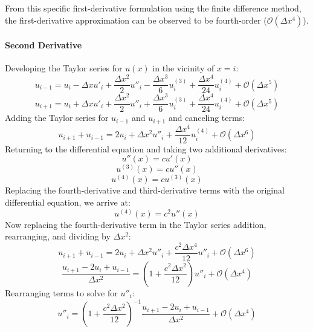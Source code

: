 \documentclass[10pt]{article}		%
\numberwithin{equation}{section}
\begin{document}
From this specific first-derivative formulation using the finite difference method, the first-derivative approximation can be observed to be fourth-order ($\mathcal{O}(\Delta x^4)$).

\paragraph{Second Derivative}
Developing the Taylor series for $u(x)$ in the vicinity of $x = i$:
\begin{equation}
u_{i-1} = u_i - \Delta x u'_i + \frac{\Delta x^2}{2} u''_i - \frac{\Delta x^3}{6} u^{(3)}_i + \frac{\Delta x^4}{24} u^{(4)}_i + \mathcal{O}(\Delta x^5)
\end{equation}
\begin{equation}
u_{i+1} = u_i + \Delta x u'_i + \frac{\Delta x^2}{2} u''_i + \frac{\Delta x^3}{6} u^{(3)}_i + \frac{\Delta x^4}{24} u^{(4)}_i + \mathcal{O}(\Delta x^5)
\end{equation}
Adding the Taylor series for $u_{i-1}$ and $u_{i+1}$ and canceling terms:
\begin{equation}
u_{i+1} + u_{i-1} = 2u_i + \Delta x^2 u''_i + \frac{\Delta x^4}{12} u^{(4)}_i + \mathcal{O}(\Delta x^6)
\end{equation}
Returning to the differential equation and taking two additional derivatives:
\begin{equation}
u''(x)=cu'(x)
\end{equation}
\begin{equation}
u^{(3)}(x)=cu''(x)
\end{equation}
\begin{equation}
u^{(4)}(x)=cu^{(3)}(x)
\end{equation}
Replacing the fourth-derivative and third-derivative terms with the original differential equation, we arrive at:
\begin{equation}
u^{(4)}(x) = c^2u''(x)
\end{equation}
Now replacing the fourth-derivative term in the Taylor series addition, rearranging, and dividing by $\Delta x^2$:
\begin{equation}
u_{i+1} + u_{i-1} = 2u_i + \Delta x^2 u''_i + \frac{c^2\Delta x^4}{12} u''_i + \mathcal{O}(\Delta x^6)
\end{equation}
\begin{equation}
\frac{u_{i+1} -2u_i + u_{i-1}}{\Delta x^2} =  \left(1 + \frac{c^2\Delta x^2}{12} \right)u''_i + \mathcal{O}(\Delta x^4)
\end{equation}
Rearranging terms to solve for $u''_i$:
\begin{equation}
u''_i = \left(1 + \frac{c^2\Delta x^2}{12} \right)^{-1} \frac{u_{i+1} -2u_i + u_{i-1}}{\Delta x^2} + \mathcal{O}(\Delta x^4)
\end{equation}
\end{document}
